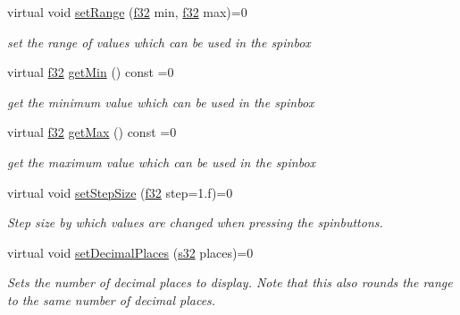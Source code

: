 \begin{DoxyCompactItemize}
virtual void \hyperlink{classirr_1_1gui_1_1IGUISpinBox_af7bc07a7be30d16a6ff27750782aaa80}{set\+Range} (\hyperlink{namespaceirr_a0277be98d67dc26ff93b1a6a1d086b07}{f32} min, \hyperlink{namespaceirr_a0277be98d67dc26ff93b1a6a1d086b07}{f32} max)=0
\begin{DoxyCompactList}\small\item\em set the range of values which can be used in the spinbox \end{DoxyCompactList}\item 
\mbox{\label{classirr_1_1gui_1_1IGUISpinBox_a22f2211e612a7cfe7847d249724cadc1}} 
virtual \hyperlink{namespaceirr_a0277be98d67dc26ff93b1a6a1d086b07}{f32} \hyperlink{classirr_1_1gui_1_1IGUISpinBox_a22f2211e612a7cfe7847d249724cadc1}{get\+Min} () const =0
\begin{DoxyCompactList}\small\item\em get the minimum value which can be used in the spinbox \end{DoxyCompactList}\item 
\mbox{\label{classirr_1_1gui_1_1IGUISpinBox_af332d184560dee8f273b50d1beca45cc}} 
virtual \hyperlink{namespaceirr_a0277be98d67dc26ff93b1a6a1d086b07}{f32} \hyperlink{classirr_1_1gui_1_1IGUISpinBox_af332d184560dee8f273b50d1beca45cc}{get\+Max} () const =0
\begin{DoxyCompactList}\small\item\em get the maximum value which can be used in the spinbox \end{DoxyCompactList}\item 
virtual void \hyperlink{classirr_1_1gui_1_1IGUISpinBox_a64296e93b52129fcf9068279baf0697d}{set\+Step\+Size} (\hyperlink{namespaceirr_a0277be98d67dc26ff93b1a6a1d086b07}{f32} step=1.f)=0
\begin{DoxyCompactList}\small\item\em Step size by which values are changed when pressing the spinbuttons. \end{DoxyCompactList}\item 
virtual void \hyperlink{classirr_1_1gui_1_1IGUISpinBox_a8a335d32cbdb7f43ca814422f8cee098}{set\+Decimal\+Places} (\hyperlink{namespaceirr_ac66849b7a6ed16e30ebede579f9b47c6}{s32} places)=0
\begin{DoxyCompactList}\small\item\em Sets the number of decimal places to display. Note that this also rounds the range to the same number of decimal places. \end{DoxyCompactList}\item 

\end{DoxyCompactItemize}
